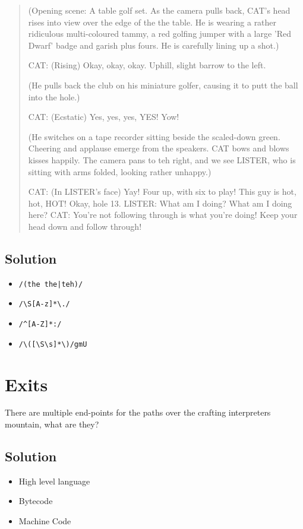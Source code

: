 \documentclass[twoside=false, DIV=14]{scrartcl}
\begin{document}
  \begin{quote}
  (Opening scene:  A table golf set.  As the camera pulls back, CAT's head
  rises into view over the edge of the the table.  He is wearing a rather
  ridiculous multi-coloured tammy, a red golfing jumper with a large 'Red
  Dwarf' badge and garish plus fours.  He is carefully lining up a shot.)
  
  CAT: (Rising) Okay, okay, okay.  Uphill, slight barrow to the left.
   
  (He pulls back the club on his miniature golfer, causing it to putt the
  ball into the hole.)
   
  CAT: (Ecstatic) Yes, yes, yes, YES!  Yow!
   
  (He switches on a tape recorder sitting beside the scaled-down green.
  Cheering and applause emerge from the speakers.  CAT bows and blows
  kisses happily.  The camera pans to teh right, and we see LISTER, who is
  sitting with arms folded, looking rather unhappy.)
   
  CAT: (In LISTER's face) Yay!  Four up, with six to play!  This guy is
  hot, hot, HOT!  Okay, hole 13.
  LISTER: What am I doing?  What am I doing here?
  CAT: You're not following through is what you're doing!  Keep your head
  down and follow through!
  \end{quote}
\subsection*{Solution}
\begin{itemize}
  \item \lstinline`/(the the|teh)/`
  \item \lstinline`/\S[A-z]*\./`
  \item \lstinline`/^[A-Z]*:/`
  \item \lstinline`/\([\S\s]*\)/gmU`
\end{itemize}



\section*{Exits}
  There are multiple end-points for the paths over the crafting interpreters mountain, what are they?
\subsection*{Solution}
    \begin{itemize}
      \item High level language
      \item Bytecode
      \item Machine Code
    \end{itemize}
\end{document}
